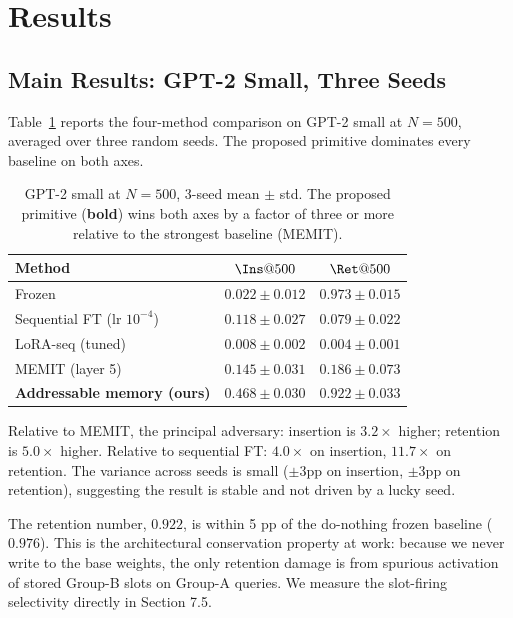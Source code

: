 \documentclass[11pt,a4paper]{article}
\begin{document}
\section{Results}

\subsection{Main Results: GPT-2 Small, Three Seeds}

Table~\ref{tab:main-gpt2} reports the four-method comparison on GPT-2
small at $N = 500$, averaged over three random seeds. The proposed
primitive dominates every baseline on both axes.

\begin{table}[h]
\centering
\caption{GPT-2 small at $N=500$, 3-seed mean $\pm$ std. The proposed
primitive (\textbf{bold}) wins both axes by a factor of three or more
relative to the strongest baseline (MEMIT).}
\label{tab:main-gpt2}
\begin{tabular}{lcc}
\toprule
\textbf{Method} & $\Ins@500$ & $\Ret@500$ \\
\midrule
Frozen & $0.022 \pm 0.012$ & $0.973 \pm 0.015$ \\
Sequential FT (lr $10^{-4}$) & $0.118 \pm 0.027$ & $0.079 \pm 0.022$ \\
LoRA-seq (tuned) & $0.008 \pm 0.002$ & $0.004 \pm 0.001$ \\
MEMIT (layer 5) & $0.145 \pm 0.031$ & $0.186 \pm 0.073$ \\
\midrule
\textbf{Addressable memory (ours)} & $\mathbf{0.468 \pm 0.030}$ & $\mathbf{0.922 \pm 0.033}$ \\
\bottomrule
\end{tabular}
\end{table}

Relative to MEMIT, the principal adversary: insertion is $3.2\times$
higher; retention is $5.0\times$ higher. Relative to sequential FT:
$4.0\times$ on insertion, $11.7\times$ on retention. The variance across
seeds is small ($\pm 3$pp on insertion, $\pm 3$pp on retention),
suggesting the result is stable and not driven by a lucky seed.

The retention number, $0.922$, is within 5 pp of the do-nothing frozen
baseline ($0.976$). This is the architectural conservation property at
work: because we never write to the base weights, the only retention
damage is from spurious activation of stored Group-B slots on Group-A
queries. We measure the slot-firing selectivity directly in Section 7.5.
\end{document}
